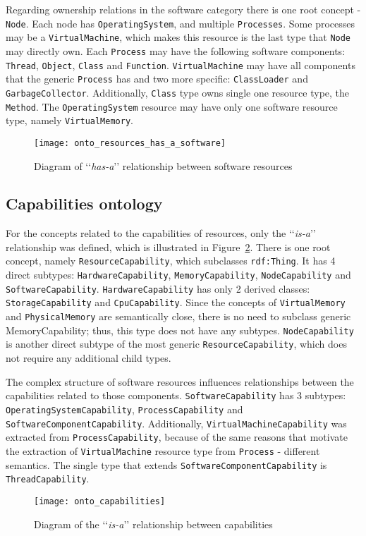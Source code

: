 Regarding ownership relations in the software category there is one root concept - \texttt{Node}. Each node has \texttt{OperatingSystem}, and multiple \texttt{Processes}. Some processes may be a \texttt{VirtualMachine}, which makes this resource is the last type that \texttt{Node} may directly own. Each \texttt{Process} may have the following software components: \texttt{Thread}, \texttt{Object}, \texttt{Class} and \texttt{Function}. \texttt{VirtualMachine} may have all components that the generic \texttt{Process} has and two more specific: \texttt{ClassLoader} and \texttt{GarbageCollector}. Additionally, \texttt{Class} type owns single one resource type, the \texttt{Method}. The \texttt{OperatingSystem} resource may have only one software resource type, namely \texttt{VirtualMemory}.

\begin{figure}[ht]
\centering
\texttt{[image: onto\_resources\_has\_a\_software]}
\caption{Diagram of \lq\lq{}\emph{has-a}\rq\rq{} relationship between software resources}
\label{fig:onto_resources_has_a_software}
\end{figure}

\pagebreak

\subsection{Capabilities ontology}
\label{subsec:arch_knowledge_capabilitie}

For the concepts related to the capabilities of resources, only the \lq\lq{}\emph{is-a}\rq\rq{} relationship was defined, which is illustrated in Figure~\ref{fig:onto_capabilities}. There is one root concept, namely \texttt{ResourceCapability}, which subclasses \texttt{rdf:Thing}. It has 4 direct subtypes: \texttt{HardwareCapability}, \texttt{MemoryCapability}, \texttt{NodeCapability} and \texttt{SoftwareCapability}. \texttt{HardwareCapability} has only 2 derived classes: \texttt{StorageCapability} and \texttt{CpuCapability}. Since the concepts of \texttt{VirtualMemory} and \texttt{PhysicalMemory} are semantically close, there is no need to subclass generic MemoryCapability; thus, this type does not have any subtypes. \texttt{NodeCapability} is another direct subtype of the most generic \texttt{ResourceCapability}, which does not require any additional child types.

The complex structure of software resources influences relationships between the capabilities related to those components. \texttt{SoftwareCapability} has 3 subtypes: \texttt{OperatingSystemCapability}, \texttt{ProcessCapability} and \texttt{SoftwareComponentCapability}. Additionally, \texttt{VirtualMachineCapability} was extracted from \texttt{ProcessCapability}, because of the same reasons that motivate the extraction of \texttt{VirtualMachine} resource type from \texttt{Process} - different semantics. The single type that extends \texttt{SoftwareComponentCapability} is \texttt{ThreadCapability}.

\begin{figure}[ht]
\centering
\texttt{[image: onto\_capabilities]}
\caption{Diagram of the \lq\lq{}\emph{is-a}\rq\rq{} relationship between capabilities}
\label{fig:onto_capabilities}
\end{figure}

